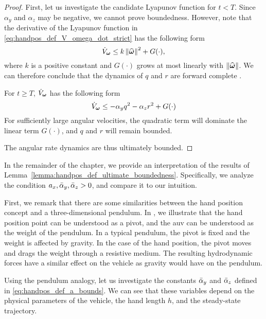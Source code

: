 \begin{proof}
    First, let us investigate the candidate Lyapunov function for $t < T$.
    Since $\alpha_y$ and $\alpha_z$ may be negative, we cannot prove boundedness.
    However, note that the derivative of the Lyapunov function in \eqref{eq:handpos_def_V_omega_dot_strict} has the following form
    \begin{equation}
        \dot{V}_{\bm{\omega}} \leq k \left\|\widehat{\bm{\omega}}\right\|^2 + G(\cdot),
    \end{equation}
    where $k$ is a positive constant and $G(\cdot)$ grows at most linearly with $\left\|\widehat{\bm{\omega}}\right\|$.
    We can therefore conclude that the dynamics of $q$ and $r$ are forward complete \cite{angeli_forward_1999}.

    For $t \geq T$, $\dot{V}_{\bm{\omega}}$ has the following form
    \begin{equation}
        \dot{V}_{\bs{\omega}} \leq -\alpha_yq^2 - \alpha_zr^2 + G(\cdot)%
    \end{equation}
    For sufficiently large angular velocities, the quadratic term will dominate the linear term $G(\cdot)$, and $q$ and $r$ will remain bounded.
    
    The angular rate dynamics are thus ultimately bounded.        
\end{proof}

In the remainder of the chapter, we provide an interpretation of the results of Lemma~\ref{lemma:handpos_def_ultimate_boundedness}.
Specifically, we analyze the condition $a_x, \Bar{\alpha}_y, \Bar{\alpha}_z > 0$, and compare it to our intuition.

First, we remark that there are some similarities between the hand position concept and a three-dimensional pendulum.
In , we illustrate that the hand position point can be understood as a pivot, and the \gls{auv} can be understood as the weight of the pendulum.
In a typical pendulum, the pivot is fixed and the weight is affected by gravity.
In the case of the hand position, the pivot moves and drags the weight through a resistive medium.
The resulting hydrodynamic forces have a similar effect on the vehicle as gravity would have on the pendulum.

Using the pendulum analogy, let us investigate the constants $\Bar{\alpha}_y$ and $\Bar{\alpha}_z$ defined in \eqref{eq:handpos_def_a_bounds}.
We can see that these variables depend on the physical parameters of the vehicle, the hand length $h$, and the steady-state trajectory.

